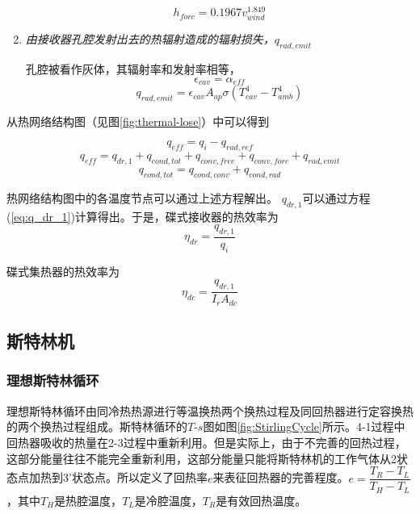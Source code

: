 \begin{enumerate}[label=(\arabic*)]
\begin{equation}
	h_{forc}=0.1967v_{wind}^{1.849}
\end{equation}

  \item \emph{由接收器孔腔发射出去的热辐射造成的辐射损失，$q_{rad,emit}$}
  
  孔腔被看作灰体，其辐射率和发射率相等，
\begin{equation}
    \epsilon_{cav}=\alpha_{eff}
\end{equation}
\begin{equation}
    q_{rad,emit}=\epsilon_{cav}A_{ap}\sigma(T_{cav}^{4}-T_{amb}^{4})
\end{equation}
\end{enumerate}

从热网络结构图（见图\ref{fig:thermal-lose}）中可以得到

\begin{equation}
  q_{eff} = q_i - q_{rad,ref}
\end{equation}
\begin{equation}
  q_{eff} = q_{dr,1} + q_{cond,tot} + q_{conv,free} + q_{conv,forc}+q_{rad,emit}
\end{equation}
\begin{equation}
  q_{cond,tot} = q_{cond,conv}+q_{cond,rad}
\end{equation}


热网络结构图中的各温度节点可以通过上述方程解出。
$q_{dr,1}$可以通过方程(\ref{eq:q_dr_1})计算得出。于是，碟式接收器的热效率为
\begin{equation}
  \eta_{dr} = \frac{q_{dr,1}}{q_i}
\end{equation}

碟式集热器的热效率为
\begin{equation}
  \eta_{dc} = \frac{q_{dr,1}}{I_rA_{dc}}
\end{equation}

\subsection{斯特林机}
\label{sec:StirlingEngineModel}
\subsubsection{理想斯特林循环}
理想斯特林循环由同冷热热源进行等温换热两个换热过程及同回热器进行定容换热的两个换热过程组成。斯特林循环的$T$-$s$图如图\ref{fig:StirlingCycle}所示。4-1过程中回热器吸收的热量在2-3过程中重新利用。但是实际上，由于不完善的回热过程，这部分能量往往不能完全重新利用，这部分能量只能将斯特林机的工作气体从2状态点加热到3'状态点。所以定义了回热率$e$来表征回热器的完善程度\cite{Formosa2010,Juhasz2010}。$e=\dfrac{T_R-T_L}{T_H-T_L}$，其中$T_H$是热腔温度，$T_L$是冷腔温度，$T_R$是有效回热温度。

